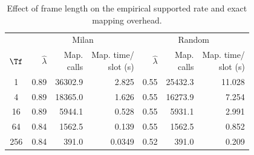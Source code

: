 \begin{table}[htbp]
\centering
\caption{Effect of frame length on the empirical supported rate and exact mapping overhead.}
\label{tab:sim_frame_overhead}
\footnotesize
\setlength{\tabcolsep}{2.1pt}
\renewcommand{\arraystretch}{1.05}
\begin{tabular*}{\columnwidth}{@{\extracolsep{\fill}}crrrrrr@{}}
\toprule
& \multicolumn{3}{c}{Milan} & \multicolumn{3}{c}{Random} \\
\cmidrule(lr){2-4}\cmidrule(l){5-7}
\(\Tf\) & \(\hat\lambda\) & \shortstack{Map.\\calls} & \shortstack{Map. time/\\slot (s)}
          & \(\hat\lambda\) & \shortstack{Map.\\calls} & \shortstack{Map. time/\\slot (s)} \\
\midrule
1   & 0.89 & 36302.9 & 2.825  & 0.55 & 25432.3 & 11.028 \\
4   & 0.89 & 18365.0 & 1.626  & 0.55 & 16273.9 &  7.254 \\
16  & 0.89 &  5944.1 & 0.528  & 0.55 &  5931.1 &  2.991 \\
64  & 0.84 &  1562.5 & 0.139  & 0.55 &  1562.5 &  0.852 \\
256 & 0.84 &   391.0 & 0.0349 & 0.52 &   391.0 &  0.209 \\
\bottomrule
\end{tabular*}
\end{table}

